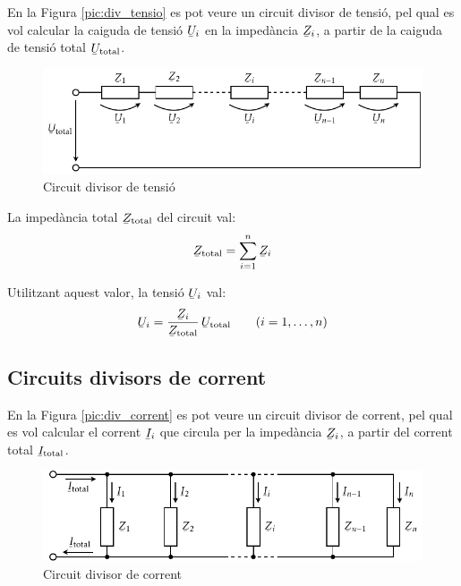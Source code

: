 En la Figura \vref{pic:div_tensio} es pot veure un circuit divisor
de tensi\'{o}, pel qual es vol calcular la caiguda de tensi\'{o}
$\cmplx{U}_i$ en la imped\`{a}ncia $\cmplx{Z}_i$, a partir de la caiguda
de tensi\'{o} total $\cmplx{U}\ped{total}$.
\begin{figure}[htb]
\centering
    \includegraphics{Imatges/Cap-Fonaments-Divisor-Tensio.pdf}
\caption{Circuit divisor de tensi\'{o}} \label{pic:div_tensio}
\end{figure}

La imped\`{a}ncia total $\cmplx{Z}\ped{total}$ del circuit val:
\begin{equation}
    \cmplx{Z}\ped{total} = \sum_{i=1}^n \cmplx{Z}_i
\end{equation}

Utilitzant aquest valor, la tensi\'{o} $\cmplx{U}_i$ val:
\begin{equation}
    \cmplx{U}_i = \frac{\cmplx{Z}_i}{\cmplx{Z}\ped{total}}\,\cmplx{U}\ped{total}\qquad (i=1,\dots,n)\label{eq:div_tensio}
\end{equation}

\subsection{Circuits divisors de corrent}

En la Figura \vref{pic:div_corrent} es pot veure un circuit divisor
de corrent, pel qual es vol calcular el corrent $\cmplx{I}_i$ que
circula per la imped\`{a}ncia $\cmplx{Z}_i$, a partir del corrent total
$\cmplx{I}\ped{total}$.
\begin{figure}[htb]
\centering
    \includegraphics{Imatges/Cap-Fonaments-Divisor-Corrent.pdf}
\caption{Circuit divisor de corrent} \label{pic:div_corrent}
\end{figure}

